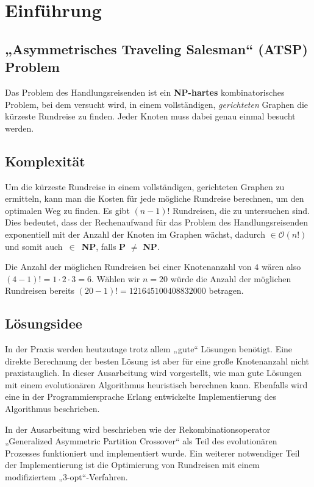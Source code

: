 \chapter{Einführung}
\section{„Asymmetrisches Traveling Salesman“ (ATSP) Problem}
Das Problem des Handlungsreisenden ist ein
\textbf{NP-hartes}\cite{exakte_algo} kombinatorisches Problem, bei dem
versucht wird, in
einem vollständigen, \textit{gerichteten} Graphen die kürzeste Rundreise zu
finden. Jeder Knoten muss dabei genau einmal besucht werden.

\section{Komplexität}
Um die kürzeste Rundreise in einem vollständigen, gerichteten Graphen zu
ermitteln, kann man die Kosten für jede mögliche Rundreise berechnen,
um den optimalen Weg zu finden. Es gibt $(n-1)!$
Rundreisen, die zu untersuchen sind\cite{pursuit}. Dies bedeutet, dass 
der Rechenaufwand für das Problem 
des Handlungsreisenden exponentiell mit der Anzahl der Knoten im Graphen
wächst, dadurch $\in 
\mathcal{O}(n!)$ und somit auch~$\in$~\textbf{NP}, falls 
\textbf{P} $\neq$ \textbf{NP}.
\begin{bem}
Die Anzahl der möglichen Rundreisen bei einer Knotenanzahl von $4$ wären also
$(4-1)! = 1 \cdot 2 \cdot 3 = 6$. Wählen wir $n = 20$ würde die
Anzahl der möglichen Rundreisen bereits $(20-1)! =
121645100408832000$ betragen.
\end{bem}

\section{Lösungsidee}
In der Praxis werden heutzutage trotz allem „gute“ Lösungen benötigt.
Eine direkte Berechnung der besten Lösung ist aber für eine große
Knotenanzahl nicht praxistauglich. In dieser Ausarbeitung wird
vorgestellt, wie man gute Lösungen mit einem evolutionären
Algorithmus heuristisch berechnen kann. Ebenfalls wird eine in der
Programmiersprache Erlang entwickelte Implementierung des Algorithmus 
beschrieben.

In der Ausarbeitung wird beschrieben wie der Rekombinationsoperator
„Generalized Asymmetric Partition Crossover“ als Teil des evolutionären
Prozesses funktioniert und implementiert wurde.
Ein weiterer notwendiger Teil der Implementierung ist die Optimierung
von Rundreisen mit einem modifiziertem „3-opt“-Verfahren.
